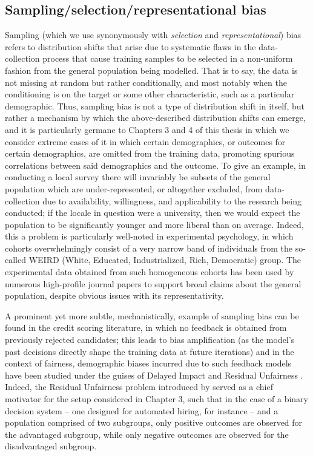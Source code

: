 \subsection{Sampling/selection/representational bias}\label{ssec:sampling-bias}
Sampling (which we use synonymously with \emph{selection} and \emph{representational}) bias refers
to distribution shifts that arise due to systematic flaws in the data-collection process that cause
training samples to be selected in a non-uniform fashion from the general population being
modelled.
%
That is to say, the data is not missing at random but rather conditionally, and most notably when
the conditioning is on the target or some other characteristic, such as a particular demographic.
%
Thus, sampling bias is not a type of distribution shift in itself, but rather a mechanism by which the
above-described distribution shifts can emerge, and it is particularly germane to Chapters 3 and 4
of this thesis in which we consider extreme cases of it in which certain demographics, or outcomes
for certain demographics, are omitted from the training data, promoting spurious correlations
between said demographics and the outcome.
%
To give an example, in conducting a local survey there will invariably be subsets of the general
population which are under-represented, or altogether excluded, from data-collection due to
availability, willingness, and applicability to the research being conducted; if the locale in
question were a university, then we would expect the population to be significantly younger and
more liberal than on average.
%
Indeed, this a problem is particularly well-noted in experimental psychology, in which cohorts
overwhelmingly consist of a very narrow band of individuals from the so-called WEIRD (White,
Educated, Industrialized, Rich, Democratic)\citep{henrich2010weirdest} group.
%
The experimental data obtained from such homogeneous cohorts has been used by numerous high-profile
journal papers to support broad claims about the general population, despite obvious issues with
its representativity.

%
A prominent yet more subtle, mechanistically, example of sampling bias can be found in the credit
scoring literature, in which no feedback is obtained from previously rejected candidates; this
leads to bias amplification (as the model's past decisions directly shape the training data at
future iterations) and in the context of fairness, demographic biases incurred due to such feedback
models have been studied under the guises of Delayed Impact \citep{liu2018delayed} and Residual
Unfairness \citep{kallus2018residual}.
%
Indeed, the Residual Unfairness problem introduced by \cite{kallus2018residual} served as a chief
motivator for the setup considered in Chapter 3, such that in the case of a binary decision system
-- one designed for automated hiring, for instance -- and a population comprised of two subgroups,
only positive outcomes are observed for the advantaged subgroup, while only negative outcomes are
observed for the disadvantaged subgroup.


